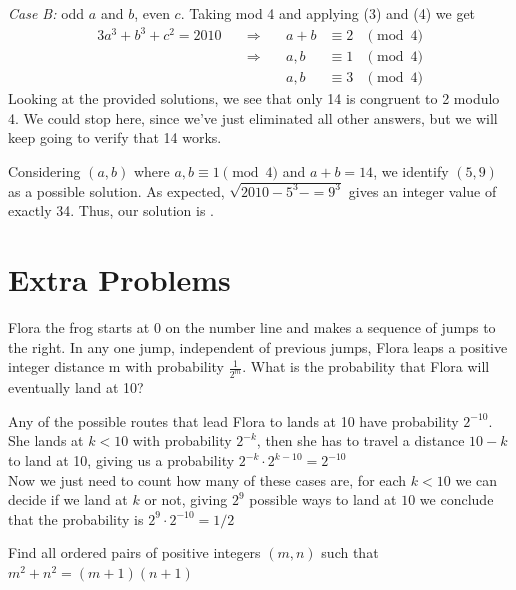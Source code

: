 \documentclass[12pt]{article}
\newcounter{problem}
\begin{document}
\begin{solution}
    \emph{Case B:} odd $a$ and $b$, even $c$. Taking mod 4 and applying (3) and (4) we get
    \begin{alignat*}{3}
        a^3 + b^3 + c^2 = 2010 \quad &\Rightarrow& \quad a + b &\equiv 2 &\pmod 4\\
        &\Rightarrow& \quad a,b &\equiv 1 &\pmod 4\\
        && \quad a,b &\equiv 3 &\pmod 4
    \end{alignat*}
    Looking at the provided solutions, we see that only 14 is congruent to 2 modulo 4. We could stop here, since we've just eliminated all other answers, but we will keep going to verify that 14 works.
    
    Considering $(a,b)$ where $a,b \equiv 1 \pmod{4}$ and $a+b=14$, we identify $(5,9)$ as a possible solution. As expected, $\sqrt{2010-5^3-=9^3}$ gives an integer value of exactly 34. Thus, our solution is .   

\end{solution}
    

\thispagestyle{fancy}
\section*{Extra Problems}

\begin{problem}[P][6][AMC 2023/12A]
   Flora the frog starts at 0 on the number line and makes a sequence of jumps to the right. In any one jump, independent of previous jumps, Flora leaps a positive integer distance m with probability $\frac{1}{2^m}$. What is the probability that Flora will eventually land at 10?
\end{problem}

\begin{solution}[1/2]
   Any of the possible routes that lead Flora to lands at 10 have probability $2^{-10}$. She lands at $k<10$ with probability $2^{-k}$, then she has to travel a distance $10-k$ to land at 10, giving us a probability $2^{-k} \cdot 2^{k-10}=2^{-10}$\\
    Now we just need to count how many of these cases are, for each $k<10$ we can decide if we land at $k$ or not, giving $2^9$ possible ways to land at $10$ we conclude that the probability is $2^9 \cdot 2^{-10} = \boxed{1/2}$
\end{solution}
    
\begin{problem}
    Find all ordered pairs of positive integers $(m,n)$ such that $m^2+n^2=(m+1)(n+1)$
\end{problem}
\end{document}
